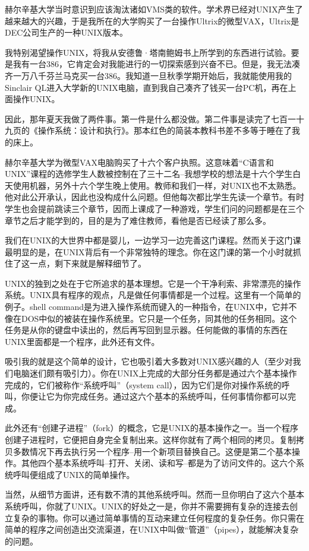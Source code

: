 赫尔辛基大学当时意识到应该淘汰诸如VMS类的软件。学术界已经对UNIX产生了越来越大的兴趣，于是我所在的大学购买了一台操作Ultrix的微型VAX，Ultrix是DEC公司生产的一种UNIX版本。

我特别渴望操作UNIX，将我从安德鲁·塔南鲍姆书上所学到的东西进行试验。要是我有一台386，它肯定会对我能进行的一切探索感到兴奋不已。但是，我无法凑齐一万八千芬兰马克买一台386。我知道一旦秋季学期开始后，我就能使用我的Sinclair QL进入大学新的UNIX电脑，直到我自己凑齐了钱买一台PC机，再在上面操作UNIX。

因此，那年夏天我做了两件事。第一件是什么都没做。第二件事是读完了七百一十九页的《操作系统：设计和执行》。那本红色的简装本教科书差不多等于睡在了我的床上。

赫尔辛基大学为微型VAX电脑购买了十六个客户执照。这意味着“C语言和UNIX”课程的选修学生人数被控制在了三十二名--我想学校的想法是十六个学生白天使用机器，另外十六个学生晚上使用。教师和我们一样，对UNIX也不太熟悉。他对此公开承认，因此也没构成什么问题。但他每次都比学生先读一个章节。有时学生也会提前跳读三个章节，因而上课成了一种游戏，学生们问的问题都是在三个章节之后才能学到的，目的是为了难住教师，看他是否已经读了那么多。

我们在UNIX的大世界中都是婴儿，一边学习一边完善这门课程。然而关于这门课最明显的是，在UNIX背后有一个非常独特的理念。你在这门课的第一个小时就抓住了这一点，剩下来就是解释细节了。

UNIX的独到之处在于它所追求的基本理想。它是一个干净利索、非常漂亮的操作系统。UNIX具有程序的观点，凡是做任何事情都是一个过程。这里有一个简单的例子。shell command是为进入操作系统而键入的一种指令，在UNIX中，它并不像在DOS中似的被装在操作系统里。它只是一个任务，同其他的任务相同。这个任务是从你的键盘中读出的，然后再写回到显示器。任何能做的事情的东西在UNIX里面都是一个程序，此外还有文件。

吸引我的就是这个简单的设计，它也吸引着大多数对UNIX感兴趣的人（至少对我们电脑迷们颇有吸引力）。你在UNIX上完成的大部分任务都是通过六个基本操作完成的，它们被称作“系统呼叫”（system call），因为它们是你对操作系统的呼叫，你便让它为你完成任务。通过这六个基本的系统呼叫，任何事情你都可以完成。

此外还有“创建子进程”（fork）的概念，它是UNIX的基本操作之一。当一个程序创建子进程时，它便把自身完全复制出来。这样你就有了两个相同的拷贝。复制拷贝多数情况下再去执行另一个程序--用一个新项目替换自己。这便是第二个基本操作。其他四个基本系统呼叫--打开、关闭、读和写--都是为了访问文件的。这六个系统呼叫便组成了UNIX的简单操作。

当然，从细节方面讲，还有数不清的其他系统呼叫。然而一旦你明白了这六个基本系统呼叫，你就了UNIX。UNIX的好处之一是，你并不需要拥有复杂的连接去创立复杂的事物。你可以通过简单事情的互动来建立任何程度的复杂任务。你只需在简单的程序之间创造出交流渠道，在UNIX中叫做“管道”（pipes），就能解决复杂的问题。

